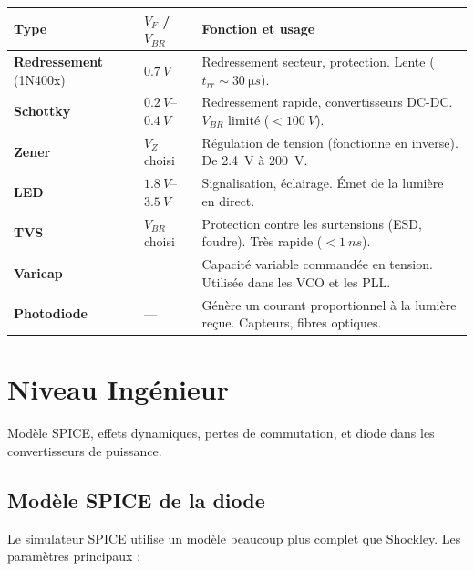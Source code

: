 \documentclass[12pt,a4paper,twoside]{book}
\begin{document}
\begin{center}
\renewcommand{\arraystretch}{1.4}
\begin{tabular}{p{2.5cm}p{2cm}p{7cm}}
\toprule
\textbf{Type} & \textbf{$V_F$ / $V_{BR}$} & \textbf{Fonction et usage} \\
\midrule
\textbf{Redressement} (1N400x) & $\SI{0.7}{V}$ & Redressement secteur, protection. Lente ($t_{rr} \sim \SI{30}{\micro s}$). \\
\textbf{Schottky} & $\SI{0.2}{V}$--$\SI{0.4}{V}$ & Redressement rapide, convertisseurs DC-DC. $V_{BR}$ limité ($< \SI{100}{V}$). \\
\textbf{Zener} & $V_Z$ choisi & Régulation de tension (fonctionne en inverse). De \SI{2.4}{V} à \SI{200}{V}. \\
\textbf{LED} & $\SI{1.8}{V}$--$\SI{3.5}{V}$ & Signalisation, éclairage. Émet de la lumière en direct. \\
\textbf{TVS} & $V_{BR}$ choisi & Protection contre les surtensions (ESD, foudre). Très rapide ($< \SI{1}{ns}$). \\
\textbf{Varicap} & — & Capacité variable commandée en tension. Utilisée dans les VCO et les PLL. \\
\textbf{Photodiode} & — & Génère un courant proportionnel à la lumière reçue. Capteurs, fibres optiques. \\
\bottomrule
\end{tabular}
\end{center}

\section{Niveau Ingénieur}

\begin{ingenieur}
Modèle SPICE, effets dynamiques, pertes de commutation, et diode dans les convertisseurs de puissance.
\end{ingenieur}

\subsection{Modèle SPICE de la diode}

Le simulateur SPICE utilise un modèle beaucoup plus complet que Shockley. Les paramètres principaux :
\end{document}
